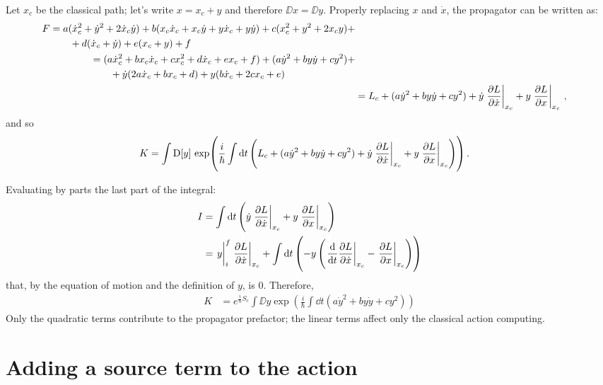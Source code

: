 \documentclass[main.tex]{subfiles}
\begin{document}
Let $x_c$ be the classical path; let's write $x = x_c + y$ and therefore $\DD{x} = \DD{y}$. Properly replacing $x$ and $\dot{x}$, the propagator can be written as:
%
\begin{subequations}
\begin{align}
\begin{split}
F &= a (\dot{x}_c^2+\dot{y}^2+2\dot{x}_c\dot{y}) + b(x_c\dot{x}_c+x_c\dot{y}+y\dot{x}_c+y\dot{y}) + c(x_c^2+y^2+2x_cy) +\\&\qquad+ d(\dot{x}_c+\dot{y}) + e(x_c+y) + f
\end{split} \\
\begin{split}
&= (a\dot{x}_c^2+bx_c\dot{x}_c+cx_c^2+d\dot{x}_c+ex_c+f) + (a\dot{y}^2 + by\dot{y} + cy^2) + \\&\qquad + \dot{y} ( 2a\dot{x}_c + bx_c + d ) +y (b\dot{x}_c + 2cx_c + e) \end{split}\\
&= L_c + (a\dot{y}^2 + by\dot{y} + cy^2) + \dot{y} \eval{\pdv{L}{\dot{x}}}_{x_c} + y \eval{\pdv{L}{x}}_{x_c}
\,,
\end{align}
\end{subequations}
%
and so
%
\begin{align}
K &= \int\DD{y} \exp( \frac{i}{\hbar}\int \dd{t} \left( L_c + (a\dot{y}^2 + by\dot{y} + cy^2) + \dot{y} \eval{\pdv{L}{\dot{x}}}_{x_c} + y \eval{\pdv{L}{x}}_{x_c} \right) )
\,.
\end{align}

Evaluating by parts the last part of the integral:
%
\begin{align}
I &= \int \dd{t} \left( \dot{y} \eval{\pdv{L}{\dot{x}}}_{x_c} + y \eval{\pdv{L}{x}}_{x_c} \right) \\
&= \eval{y}_i^f \eval{\pdv{L}{\dot{x}}}_{x_c} + \int \dd{t} \left( -y \left( \eval{\dv{t}\pdv{L}{\dot{x}}}_{x_c} - \eval{\pdv{L}{x}}_{x_c} \right) \right)
\end{align}
that, by the equation of motion and the definition of $y$, is 0. Therefore,
\begin{align}
K &= e^{\frac{i}{\hbar} S_c }\int \DD{y} \exp( \frac{i}{\hbar} \int \dd{t} (a\dot{y}^2 + by\dot{y} + cy^2) )
\end{align}
Only the quadratic terms contribute to the propagator prefactor; the linear terms affect only the classical action computing.

\section{Adding a source term to the action}
\end{document}
